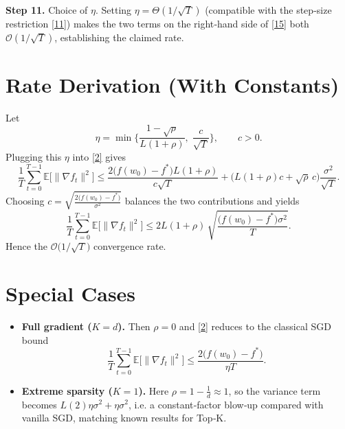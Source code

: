 \documentclass{article}
\begin{document}
\noindent\textbf{Step 11.} Choice of $\eta$.  
Setting $\eta = \Theta(1/\sqrt{T})$ (compatible with the step‑size restriction \eqref{11}) makes the two terms on the right‑hand side of \eqref{15} both $\mathcal{O}(1/\sqrt{T})$, establishing the claimed rate.

\section*{Rate Derivation (With Constants)}
Let
\[
\eta = \min\Big\{\frac{1-\sqrt{\rho}}{L(1+\rho)},\;\frac{c}{\sqrt{T}}\Big\},
\qquad c>0.
\]
Plugging this $\eta$ into \eqref{2} gives
\[
\frac{1}{T}\sum_{t=0}^{T-1}\mathbb{E}\big[\|\nabla f_t\|^{2}\big]
\le
\frac{2\big(f(w_0)-f^{*}\big)L(1+\rho)}{c\sqrt{T}}
   +\big(L(1+\rho)c+\sqrt{\rho}\,c\big)\frac{\sigma^{2}}{\sqrt{T}}.
\]
Choosing $c=\sqrt{\frac{2\big(f(w_0)-f^{*}\big)}{\sigma^{2}}}$ balances the two contributions and yields
\[
\frac{1}{T}\sum_{t=0}^{T-1}\mathbb{E}\big[\|\nabla f_t\|^{2}\big]
\le
2L(1+\rho)\,
\sqrt{\frac{\big(f(w_0)-f^{*}\big)\sigma^{2}}{T}}.
\]
Hence the $\mathcal{O}\!\big(1/\sqrt{T}\big)$ convergence rate.

\section*{Special Cases}
\begin{itemize}
\item \textbf{Full gradient ($K=d$).} Then $\rho=0$ and \eqref{2} reduces to the classical SGD bound
\[
\frac{1}{T}\sum_{t=0}^{T-1}\mathbb{E}\big[\|\nabla f_t\|^{2}\big]
\le
\frac{2\big(f(w_0)-f^{*}\big)}{\eta T}.
\]
\item \textbf{Extreme sparsity ($K=1$).} Here $\rho=1-\tfrac{1}{d}\approx1$, so the variance term becomes
$L(2)\eta\sigma^{2}+\eta\sigma^{2}$, i.e. a constant‑factor blow‑up compared with vanilla SGD, matching known results for Top‑K.
\end{itemize}
\end{document}
